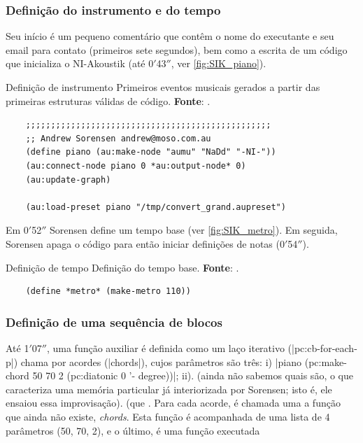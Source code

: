 \subsubsection{Definição do instrumento e do tempo}\label{sec:define_instr}

Seu início é um pequeno comentário que contêm o nome do executante e seu email para contato (primeiros sete segundos), bem como a escrita de um código que inicializa o NI-Akoustik (até 0$'$43$''$, ver \autoref{fig:SIK_piano}). 

\begin{example}{Definição de instrumento}
  \centering 
Primeiros eventos musicais gerados a partir das primeiras estruturas válidas de código. \textbf{Fonte}: \cite{sorensen_youtube_2014}.
  \begin{verbatim}
    ;;;;;;;;;;;;;;;;;;;;;;;;;;;;;;;;;;;;;;;;;;;;;;;;;
    ;; Andrew Sorensen andrew@moso.com.au
    (define piano (au:make-node "aumu" "NaDd" "-NI-"))
    (au:connect-node piano 0 *au:output-node* 0)
    (au:update-graph)

    (au:load-preset piano "/tmp/convert_grand.aupreset")
  \end{verbatim}
  \label{fig:SIK_piano}
\end{example}

\newcommand{\tempo}[2]{#1$'$#2$''$}

Em \tempo{0}{52} Sorensen define um tempo base (ver \autoref{fig:SIK_metro}). Em seguida, Sorensen apaga o código para então iniciar definições de notas (\tempo{0}{54}).

\begin{example}{Definição de tempo}
  \centering
  Definição do tempo base. \textbf{Fonte}: \cite{sorensen_youtube_2014}.
  \begin{verbatim}
    (define *metro* (make-metro 110))
  \end{verbatim}
  \label{fig:SIK_metro}
\end{example}

\subsubsection{Definição de uma sequência de blocos}

Até \tempo{1}{07}, uma função auxiliar é definida como um laço iterativo (|pc:cb-for-each-p|) chama por acordes (|chords|), cujos parâmetros são três: i) |piano (pc:make-chord 50 70 2 (pc:diatonic 0 '- degree))|; ii). (ainda não sabemos quais são, o que caracteriza uma memória particular já interiorizada por Sorensen; isto é, ele ensaiou essa improvisação). (que  .  Para cada acorde, é chamada uma a função que ainda não existe, \emph{chords}. Esta função é acompanhada de uma lista de 4 parâmetros (50, 70, 2), e o último,  é uma função  executada

